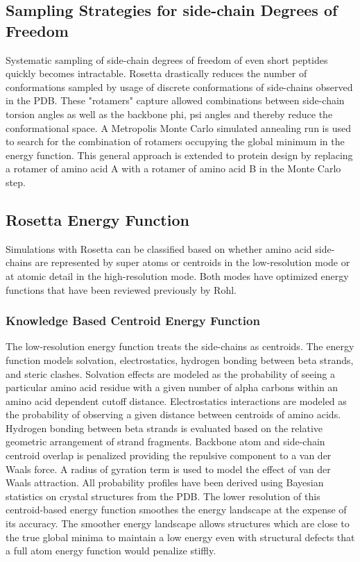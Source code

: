 \subsection{Sampling Strategies for side-chain Degrees of Freedom}
Systematic sampling of side-chain degrees of freedom of even short peptides quickly becomes intractable\citep{Levinthal:1968vd}.
Rosetta drastically reduces the number of conformations sampled by usage of discrete conformations of side-chains observed in the PDB\citep{Kuhlman:2000tc,Dunbrack:1993jt}.
These "rotamers" capture allowed combinations between side-chain torsion angles as well as the backbone phi, psi angles and thereby reduce the conformational space\citep{Dunbrack:1993jt}.
A Metropolis Monte Carlo simulated annealing run is used to search for the combination of rotamers occupying the global minimum in the energy function\citep{Kuhlman:2000tc,LeaverFay:2005vc}.
This general approach is extended to protein design by replacing a rotamer of amino acid A with a rotamer of amino acid B in the Monte Carlo step.

\subsection{Rosetta Energy Function}
Simulations with Rosetta can be classified based on whether amino acid side-chains are represented by super atoms or centroids in the low-resolution mode or at atomic detail in the high-resolution mode.
Both modes have optimized energy functions that have been reviewed previously by Rohl\citep{Rohl:2004dh}.

\subsubsection{Knowledge Based Centroid Energy Function}
The low-resolution energy function treats the side-chains as centroids\citep{Simons:1997do,Simons:1999wp}.
The energy function models solvation, electrostatics, hydrogen bonding between beta strands, and steric clashes.
Solvation effects are modeled as the probability of seeing a particular amino acid residue with a given number of alpha carbons within an amino acid dependent cutoff distance.
Electrostatics interactions are modeled as the probability of observing a given distance between centroids of amino acids.
Hydrogen bonding between beta strands is evaluated based on the relative geometric arrangement of strand fragments.
Backbone atom and side-chain centroid overlap is penalized providing the repulsive component to a van der Waals force.
A radius of gyration term is used to model the effect of van der Waals attraction.
All probability profiles have been derived using Bayesian statistics on crystal structures from the PDB.
The lower resolution of this centroid-based energy function smoothes the energy landscape at the expense of its accuracy.
The smoother energy landscape allows structures which are close to the true global minima to maintain a low energy even with structural defects that a full atom energy function would penalize stiffly.

